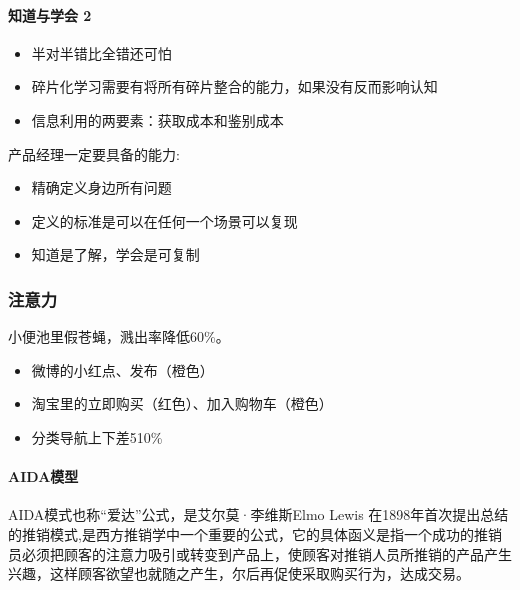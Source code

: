 \documentclass[letterpaper,11pt,english]{sphinxmanual}
\begin{document}
\paragraph{知道与学会 2\sphinxfootnotemark[354]}
\label{\detokenize{chapter_idea/critical:id6}}%
\begin{footnotetext}[354]\sphinxAtStartFootnote
{}
%
\end{footnotetext}\ignorespaces \begin{itemize}
\item {} 
半对半错比全错还可怕

\item {} 
碎片化学习需要有将所有碎片整合的能力，如果没有反而影响认知

\item {} 
信息利用的两要素：获取成本和鉴别成本

\end{itemize}

产品经理一定要具备的能力:
\begin{itemize}
\item {} 
精确定义身边所有问题

\item {} 
定义的标准是可以在任何一个场景可以复现

\item {} 
知道是了解，学会是可复制

\end{itemize}


\subsubsection{注意力}
\label{\detokenize{chapter_idea/attention:id1}}\label{\detokenize{chapter_idea/attention::doc}}
小便池里假苍蝇，溅出率降低60\%。
\begin{itemize}
\item {} 
微博的小红点、发布（橙色）

\item {} 
淘宝里的立即购买（红色）、加入购物车（橙色）

\item {} 
分类导航上下差5\sphinxhyphen{}10\%

\end{itemize}


\paragraph{AIDA模型}
\label{\detokenize{chapter_idea/attention:aida}}
AIDA模式也称“爱达”公式，是艾尔莫·李维斯Elmo Lewis
在1898年首次提出总结的推销模式,是西方推销学中一个重要的公式，它的具体函义是指一个成功的推销员必须把顾客的注意力吸引或转变到产品上，使顾客对推销人员所推销的产品产生兴趣，这样顾客欲望也就随之产生，尔后再促使采取购买行为，达成交易。
\end{document}
